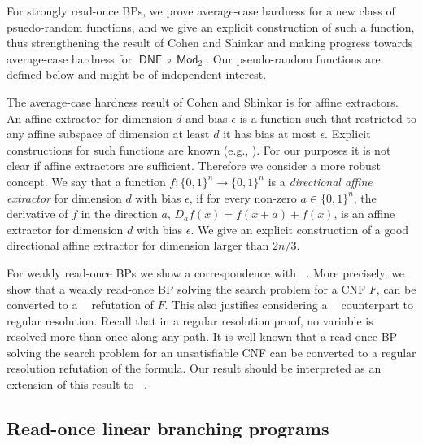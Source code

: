 \documentclass[10pt,a4paper]{article}
\theoremstyle{definition}
\theoremstyle{remark}
\DeclareMathOperator{\dnf}{\mathsf{DNF}}
\DeclareMathOperator{\Mod}{\mathsf{Mod}}
\DeclareMathOperator{\reslin}{\mathsf{Res}[\oplus]}
\newcommand{\Q}{{\{0,1\}}}
\newcommand{\sreadonce}{strongly read-once}
\newcommand{\wreadonce}{weakly read-once}
\newcommand{\Readonce}{Read-once}
\begin{document}
%

%

For \sreadonce{} BPs, we prove average-case hardness for a new class of psuedo-random functions, and we give an explicit construction of such a function, thus strengthening the result of Cohen and Shinkar \cite{DBLP:conf/innovations/CohenS16} and making progress towards average-case hardness for $\dnf \circ \Mod_2$. Our pseudo-random functions are defined below and might be of independent interest.

\bigskip
{} The average-case hardness result of Cohen and Shinkar \cite{DBLP:conf/innovations/CohenS16} is for affine extractors. An affine extractor for dimension $d$ and bias $\epsilon$ is a function such that restricted to any affine subspace of dimension at least $d$ it has bias at most $\epsilon$. Explicit constructions for such functions are known (e.g., \cite{MR2306652,DBLP:journals/combinatorica/Yehudayoff11,DBLP:journals/siamcomp/Ben-SassonK12}). For our purposes it is not clear if affine extractors are sufficient. Therefore we consider a more robust concept. We say that a function $f\colon \Q^n \rightarrow \Q^n$ is a \emph{directional affine extractor} for dimension $d$ with bias $\epsilon$, if for every non-zero $a \in \Q^n$, the derivative of $f$ in the direction $a$, $D_a f(x) = f(x+a) + f(x)$, is an affine extractor for dimension $d$ with bias $\epsilon$. We give an explicit construction of a good directional affine extractor for dimension larger than $2n/3$.



For \wreadonce{} BPs we show a correspondence with $\reslin$. More precisely, we show that a \wreadonce{} BP solving the search problem for a CNF $F$, can be converted to a $\reslin$ refutation of $F$. This also justifies considering a $\reslin$ counterpart to regular resolution. Recall that in a regular resolution proof, no variable is resolved more than once along any path. It is well-known that a read-once BP solving the search problem for an unsatisfiable CNF can be converted to a regular resolution refutation of the formula. Our result should be interpreted as an extension of this result to $\reslin$.



%

%
%
%
%





\subsection{\Readonce{} linear branching programs}
\end{document}
